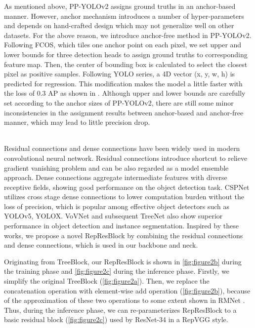 \documentclass[final]{cvpr}
\begin{document}
 As mentioned above, PP-YOLOv2\cite{huang2021pp-yolov2} assigns ground truths in an anchor-based manner. However, anchor mechanism introduces a number of hyper-parameters and depends on hand-crafted design which may not generalize well on other datasets. For the above reason, we introduce anchor-free method in PP-YOLOv2. Following FCOS\cite{tian2019fcos}, which tiles one anchor point on each pixel, we set upper and lower bounds for three detection heads to assign ground truths to corresponding feature map. Then, the center of bounding box is calculated to select the closest pixel as positive samples. Following YOLO series, a 4D vector (x, y, w, h) is predicted for regression. This modification makes the model a little faster with the loss of 0.3 AP as shown in . Although upper and lower bounds are carefully set according to the anchor sizes of PP-YOLOv2, there are still some minor inconsistencies in the assignment results between anchor-based and anchor-free manner, which may lead to little precision drop.





~\\

 Residual connections\cite{he2016deep, xie2017aggregated, hu2018squeeze} and dense connections\cite{huang2017densely, lee2019energy, rao2021treenet}  have been widely used in modern convolutional neural network. Residual connections introduce shortcut to relieve gradient vanishing problem and can be also regarded as a model ensemble approach. Dense connections aggregate intermediate features with diverse receptive fields, showing good performance on the object detection task. CSPNet\cite{wang2020cspnet} utilizes cross stage dense connections to lower computation burden without the loss of precision, which is popular among effective object detectors such as YOLOv5\cite{glenn_jocher_2022_6222936}, YOLOX\cite{ge2021yolox}. VoVNet\cite{lee2019energy} and subsequent TreeNet\cite{rao2021treenet} also show superior performance in object detection and instance segmentation. Inspired by these works, we propose a novel RepResBlock by combining the residual connections and dense connections, which is used in our backbone and neck.

Originating from TreeBlock\cite{rao2021treenet}, our RepResBlock is shown in \cref{fig:figure2b} during the training phase and \cref{fig:figure2c} during the inference phase. Firstly, we simplify the original TreeBlock (\cref{fig:figure2a}). Then, we replace the concatenation operation with element-wise add operation (\cref{fig:figure2b}), because of the approximation of these two operations to some extent shown in RMNet \cite{meng2021rmnet}. Thus, during the inference phase, we can re-parameterizes RepResBlock to a basic residual block (\cref{fig:figure2c}) used by ResNet-34 in a RepVGG\cite{ding2021repvgg} style. 
\end{document}
